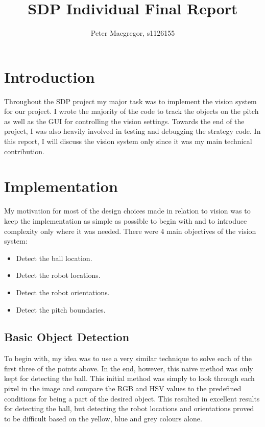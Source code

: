 \documentclass[dvips]{article}
\begin{document}
\sloppy
\title{SDP Individual Final Report}
 
\author{Peter Macgregor, s1126155}
 
\maketitle

\section{Introduction}
Throughout the SDP project my major task was to implement the vision system for our project.
I wrote the majority of the code to track the objects on the pitch as well as the GUI for controlling
the vision settings. Towards the end of the project, I was also heavily involved in testing and
debugging the strategy code. In this report, I will discuss the vision system only since it was
my main technical contribution.

\section{Implementation}
My motivation for most of the design choices made in relation to vision was to keep the
implementation as simple as possible to begin with and to introduce complexity only where it
was needed. There were 4 main objectives of the vision system:
\begin{itemize}
\item{Detect the ball location.}
\item{Detect the robot locations.}
\item{Detect the robot orientations.}
\item{Detect the pitch boundaries.}
\end{itemize}

\subsection{Basic Object Detection}
To begin with, my idea was to use a very similar technique to solve each of the first three of the
points above. In the end, however, this naive method was only kept for detecting the ball. This initial
method was simply to look through each pixel in the image and compare the RGB and HSV values
to the predefined conditions for being a part of the desired object. This resulted in excellent
results for detecting the ball, but detecting the robot locations and orientations proved to be
difficult based on the yellow, blue and grey colours alone.
\end{document}
